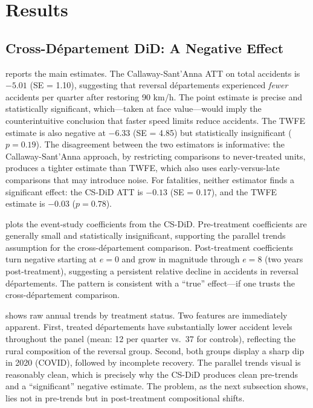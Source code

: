 \documentclass[12pt]{article}
\begin{document}
\section{Results} \label{sec:results}

\subsection{Cross-D\'{e}partement DiD: A Negative Effect}

 reports the main estimates. The Callaway-Sant'Anna ATT on total accidents is $-5.01$ (SE = 1.10), suggesting that reversal d\'{e}partements experienced \textit{fewer} accidents per quarter after restoring 90 km/h. The point estimate is precise and statistically significant, which---taken at face value---would imply the counterintuitive conclusion that faster speed limits reduce accidents. The TWFE estimate is also negative at $-6.33$ (SE = 4.85) but statistically insignificant ($p = 0.19$). The disagreement between the two estimators is informative: the Callaway-Sant'Anna approach, by restricting comparisons to never-treated units, produces a tighter estimate than TWFE, which also uses early-versus-late comparisons that may introduce noise. For fatalities, neither estimator finds a significant effect: the CS-DiD ATT is $-0.13$ (SE = 0.17), and the TWFE estimate is $-0.03$ ($p = 0.78$).

 plots the event-study coefficients from the CS-DiD. Pre-treatment coefficients are generally small and statistically insignificant, supporting the parallel trends assumption for the cross-d\'{e}partement comparison. Post-treatment coefficients turn negative starting at $e = 0$ and grow in magnitude through $e = 8$ (two years post-treatment), suggesting a persistent relative decline in accidents in reversal d\'{e}partements. The pattern is consistent with a ``true'' effect---if one trusts the cross-d\'{e}partement comparison.

 shows raw annual trends by treatment status. Two features are immediately apparent. First, treated d\'{e}partements have substantially lower accident levels throughout the panel (mean: 12 per quarter vs.\ 37 for controls), reflecting the rural composition of the reversal group. Second, both groups display a sharp dip in 2020 (COVID), followed by incomplete recovery. The parallel trends visual is reasonably clean, which is precisely why the CS-DiD produces clean pre-trends and a ``significant'' negative estimate. The problem, as the next subsection shows, lies not in pre-trends but in post-treatment compositional shifts.
\end{document}
